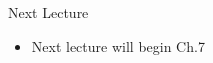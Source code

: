 \documentclass[aspectratio=1610]{beamer}
\begin{document}
%			
%			

\begin{frame}[wide]{Next Lecture}
	\begin{itemize}
		\item Next lecture will begin Ch.7
	\end{itemize}
\end{frame}
\end{document}
